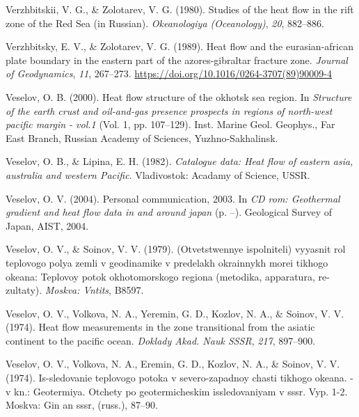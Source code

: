 \documentclass[draft,linenumbers]{agujournal2018}
\begin{document}
\leavevmode{}%
Verzhbitskii, V. G., \& Zolotarev, V. G. (1980). Studies of the heat
flow in the rift zone of the {Red Sea (in Russian)}. \emph{Okeanologiya
(Oceanology)}, \emph{20}, 882--886.

\leavevmode{}%
Verzhbitsky, E. V., \& Zolotarev, V. G. (1989). Heat flow and the
eurasian-african plate boundary in the eastern part of the
azores-gibraltar fracture zone. \emph{Journal of Geodynamics},
\emph{11}, 267--273. \url{https://doi.org/10.1016/0264-3707(89)90009-4}

\leavevmode{}%
Veselov, O. B. (2000). Heat flow structure of the okhotsk sea region. In
\emph{Structure of the earth crust and oil-and-gas presence prospects in
regions of north-west pacific margin - vol.1} (Vol. 1, pp. 107--129).
Inst. Marine Geol. Geophys., Far East Branch, Russian Academy of
Sciences, Yuzhno-Sakhalinsk.

\leavevmode{}%
Veselov, O. B., \& Lipina, E. H. (1982). \emph{Catalogue data: Heat flow
of eastern asia, australia and western {Pacific}}. Vladivostok: Acadamy
of Science, USSR.

\leavevmode{}%
Veselov, O. V. (2004). Personal communication, 2003. In \emph{CD rom:
Geothermal gradient and heat flow data in and around japan} (p. --).
Geological Survey of Japan, AIST, 2004.

\leavevmode{}%
Veselov, O. V., \& Soinov, V. V. (1979). (Otvetstwennye ispolniteli)
vyyasnit rol teplovogo polya zemli v geodinamike v predelakh okrainnykh
morei tikhogo okeana: Teplovoy potok okhotomorskogo regiona (metodika,
apparatura, re- zultaty). \emph{Moskva: Vntits}, B8597.

\leavevmode{}%
Veselov, O. V., Volkova, N. A., Yeremin, G. D., Kozlov, N. A., \&
Soinov, V. V. (1974). Heat flow measurements in the zone transitional
from the asiatic continent to the pacific ocean. \emph{Doklady Akad.
Nauk SSSR}, \emph{217}, 897--900.

\leavevmode{}%
Veselov, O. V., Volkova, N. A., Eremin, G. D., Kozlov, N. A., \& Soinov,
V. V. (1974). Is-sledovanie teplovogo potoka v severo-zapadnoy chasti
tikhogo okeana. - v kn.: Geotermiya. Otchety po geotermicheskim
issledovaniyam v sssr. Vyp. 1-2. Moskva: Gin an sssr, (russ.), 87--90.
\end{document}
